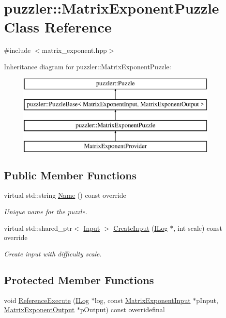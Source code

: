 \hypertarget{a00018}{}\section{puzzler\+:\+:Matrix\+Exponent\+Puzzle Class Reference}
\label{a00018}


{\ttfamily \#include $<$matrix\+\_\+exponent.\+hpp$>$}

Inheritance diagram for puzzler\+:\+:Matrix\+Exponent\+Puzzle\+:\begin{figure}[H]
\begin{center}
\leavevmode
\includegraphics[height=4.000000cm]{a00018}
\end{center}
\end{figure}
\subsection*{Public Member Functions}
\begin{DoxyCompactItemize}
\item 
virtual std\+::string \hyperlink{a00018_a06712fc62c3e8f410b9bee3f2b17c2eb}{Name} () const override
\begin{DoxyCompactList}\small\item\em Unique name for the puzzle. \end{DoxyCompactList}\item 
virtual std\+::shared\+\_\+ptr$<$ \hyperlink{a00009}{Input} $>$ \hyperlink{a00018_a00f7f772f504c8bde8b900fd5c893153}{Create\+Input} (\hyperlink{a00008}{I\+Log} $\ast$, int scale) const override
\begin{DoxyCompactList}\small\item\em Create input with difficulty scale. \end{DoxyCompactList}\end{DoxyCompactItemize}
\subsection*{Protected Member Functions}
\begin{DoxyCompactItemize}
\item 
void \hyperlink{a00018_ad941df5fabd37a9971f41c6921bce75d}{Reference\+Execute} (\hyperlink{a00008}{I\+Log} $\ast$log, const \hyperlink{a00015}{Matrix\+Exponent\+Input} $\ast$p\+Input, \hyperlink{a00016}{Matrix\+Exponent\+Output} $\ast$p\+Output) const overridefinal
\end{DoxyCompactItemize}
